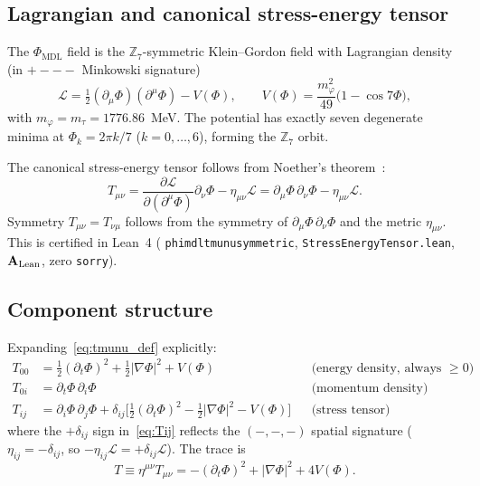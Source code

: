 \documentclass[11pt]{article}
\theoremstyle{remark}
\newcommand{\PHIMDL}{\Phi_{\mathrm{MDL}}}
\newcommand{\ZS}{\mathbb{Z}_7}
\newcommand{\lean}[1]{%
  \penalty-100
  \begingroup\def\_{\textunderscore\allowbreak}\texttt{#1}\endgroup}
\newcommand{\CatAL}{\ensuremath{\textbf{A}_{\rm Lean}}}
\newcommand{\Tmunu}{T_{\mu\nu}}
\begin{document}
\subsection{Lagrangian and canonical stress-energy tensor}

The $\PHIMDL$ field is the $\ZS$-symmetric Klein--Gordon field with Lagrangian
density (in $+{-}{-}{-}$ Minkowski signature)
\begin{equation}
  \mathcal{L} = \tfrac{1}{2}(\partial_\mu\Phi)(\partial^\mu\Phi) - V(\Phi),
  \qquad V(\Phi) = \frac{m_\varphi^2}{49}\bigl(1 - \cos 7\Phi\bigr),
\label{eq:lagrangian}
\end{equation}
with $m_\varphi = m_\tau = 1776.86$~MeV.
The potential has exactly seven degenerate minima at $\Phi_k = 2\pi k/7$ ($k = 0,\ldots,6$),
forming the $\ZS$ orbit.

The canonical stress-energy tensor follows from Noether's theorem~\cite{SpivackPhiMDLField}:
\begin{equation}
  \Tmunu = \frac{\partial\mathcal{L}}{\partial(\partial^\mu\Phi)}\partial_\nu\Phi
  - \eta_{\mu\nu}\mathcal{L}
  = \partial_\mu\Phi\,\partial_\nu\Phi - \eta_{\mu\nu}\mathcal{L}.
\label{eq:tmunu_def}
\end{equation}
Symmetry $\Tmunu = T_{\nu\mu}$ follows from the symmetry of $\partial_\mu\Phi\,\partial_\nu\Phi$
and the metric $\eta_{\mu\nu}$.
This is certified in Lean~4 (\lean{phimdl\_tmunu\_symmetric},
\lean{StressEnergyTensor.lean}, $\CatAL$, zero \texttt{sorry}).

\subsection{Component structure}

Expanding~\eqref{eq:tmunu_def} explicitly:
\begin{align}
  T_{00} &= \tfrac{1}{2}(\partial_t\Phi)^2 + \tfrac{1}{2}|\nabla\Phi|^2 + V(\Phi)
            &&\text{(energy density, always $\geq 0$)}
\label{eq:T00}\\
  T_{0i} &= \partial_t\Phi\,\partial_i\Phi
            &&\text{(momentum density)}
\label{eq:T0i}\\
  T_{ij} &= \partial_i\Phi\,\partial_j\Phi
            + \delta_{ij}\bigl[\tfrac{1}{2}(\partial_t\Phi)^2
            - \tfrac{1}{2}|\nabla\Phi|^2 - V(\Phi)\bigr]
            &&\text{(stress tensor)}
\label{eq:Tij}
\end{align}
where the $+\delta_{ij}$ sign in~\eqref{eq:Tij} reflects the $(-,-,-)$ spatial
signature ($\eta_{ij} = -\delta_{ij}$, so $-\eta_{ij}\mathcal{L} = +\delta_{ij}\mathcal{L}$).
The trace is
\begin{equation}
  T \equiv \eta^{\mu\nu}\Tmunu = -(\partial_t\Phi)^2 + |\nabla\Phi|^2 + 4V(\Phi).
\label{eq:trace}
\end{equation}
\end{document}
